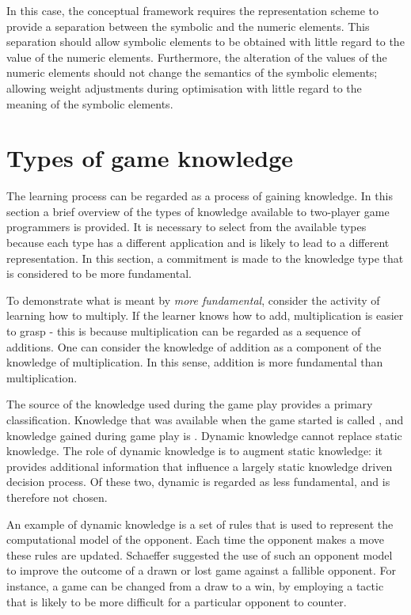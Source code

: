 In this case, the conceptual framework requires the representation scheme to provide a separation between the symbolic and the numeric elements. This separation should allow symbolic elements to be obtained with little regard to the value of the numeric elements. Furthermore, the alteration of the values of the numeric elements should not change the semantics of the symbolic elements; allowing weight adjustments during optimisation with little regard to the meaning of the symbolic elements.

\section{Types of game knowledge}
\label{sec:knowledge-types}
The learning process can be regarded as a process of gaining knowledge. In this section a brief overview of the types of knowledge available to two-player game programmers is provided. It is necessary to select from the available types because each type has a different application and is likely to lead to a different representation.  In this section,  a commitment is made to the knowledge type that is considered to be more fundamental.  

To demonstrate what is meant by {\it more fundamental}, consider the activity of learning how to multiply. If the learner knows how to add, multiplication is easier to grasp - this is  because multiplication can be regarded as a sequence of additions. One can consider the knowledge of addition as a component of the knowledge of multiplication.  In this sense, addition is more fundamental than multiplication.  

The source of the knowledge used during the game play provides a primary classification. Knowledge that was available when the game started is called , and knowledge gained during game play is .  Dynamic knowledge cannot replace static knowledge.  The role of dynamic knowledge is to augment static knowledge: it provides additional information that influence a largely static knowledge driven decision process.  Of these two, dynamic is regarded as less fundamental, and is therefore not chosen.

An example of dynamic knowledge is a set of rules that is used to represent the computational model of the opponent.  Each time the opponent makes a move these rules are updated. Schaeffer \cite{schaeffer:reexamination} suggested the use of such an opponent model to improve the outcome of a drawn or lost game against a fallible opponent.  For instance, a game can be changed from a draw to a win, by employing a tactic that is likely to be more difficult for a particular opponent to counter.  

